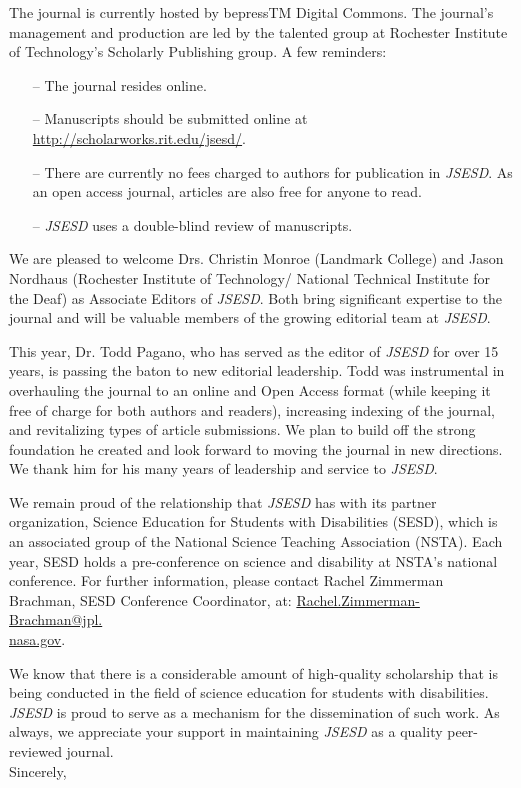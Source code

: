 \documentclass[11.5pt]{sig-alternate}
\begin{document}
\begin{large}
The journal is currently hosted by bepressTM Digital Commons. The journal’s management and production are led by the talented group at Rochester Institute of Technology’s Scholarly Publishing group. A few reminders:

\begin{itemize}
    \item[–] The journal resides online.
    \item[–] Manuscripts should be submitted online at \url{http://scholarworks.rit.edu/jsesd/}. 
    \item[–] There are currently no fees charged to authors for publication in \textit{JSESD}. As an open access journal, articles are also free for anyone to read.
    \item[–] \textit{JSESD} uses a double-blind review of manu\-scripts.
\end{itemize}
\newpage
We are pleased to welcome Drs. Christin Monroe (Landmark College) and Jason Nordhaus (Rochester Institute of Technology/ National Technical Institute for the Deaf) as Associate Editors of \textit{JSESD}. Both bring significant expertise to the journal and will be valuable members of the growing editorial team at \textit{JSESD}.

This year, Dr. Todd Pagano, who has served as the editor of \textit{JSESD} for over 15 years, is passing the baton to new editorial leadership. Todd was instrumental in overhauling the journal to an online and Open Access format (while keeping it free of charge for both authors and readers), increasing indexing of the journal, and revitalizing types of article submissions. We plan to build off the strong foundation he created and look forward to moving the journal in new directions. We thank him for his many years of leadership and service to \textit{JSESD}.

We remain proud of the relationship that \textit{JSESD} has with its partner organization, Science Education for Students with Disabilities (SESD), which is an associated group of the National Science Teaching Association (NSTA). Each year, SESD holds a pre-conference on science and disability at NSTA’s national conference. For further information, please contact Rachel Zimmerman Brachman, SESD Conference Coordinator, at: \href{mailto:Rachel.Zimmerman-Brachman@jpl.nasa.gov}{Rachel.Zimmerman-Brachman@jpl.\\nasa.gov}.

We know that there is a considerable amount of high-quality scholarship that is being conducted in the field of science education for students with disabilities. \textit{JSESD} is proud to serve as a mechanism for the dissemination of such work. As always, we appreciate your support in maintaining \textit{JSESD} as a quality peer-reviewed journal.\\
\newpage
Sincerely,\\


\end{large}
\end{document}
